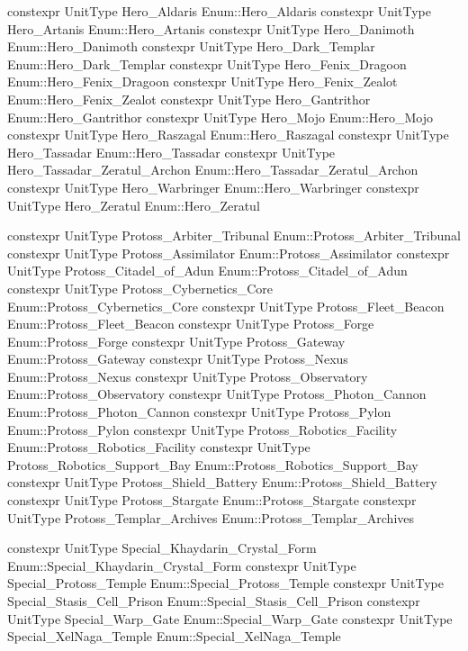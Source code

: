 \begin{codebox}[变量(神族英雄单位)]
constexpr UnitType Hero_Aldaris {Enum::Hero_Aldaris}
constexpr UnitType Hero_Artanis {Enum::Hero_Artanis}
constexpr UnitType Hero_Danimoth {Enum::Hero_Danimoth}
constexpr UnitType Hero_Dark_Templar {Enum::Hero_Dark_Templar}
constexpr UnitType Hero_Fenix_Dragoon {Enum::Hero_Fenix_Dragoon}
constexpr UnitType Hero_Fenix_Zealot {Enum::Hero_Fenix_Zealot}
constexpr UnitType Hero_Gantrithor {Enum::Hero_Gantrithor}
constexpr UnitType Hero_Mojo {Enum::Hero_Mojo}
constexpr UnitType Hero_Raszagal {Enum::Hero_Raszagal}
constexpr UnitType Hero_Tassadar {Enum::Hero_Tassadar}
constexpr UnitType Hero_Tassadar_Zeratul_Archon {Enum::Hero_Tassadar_Zeratul_Archon}
constexpr UnitType Hero_Warbringer {Enum::Hero_Warbringer}
constexpr UnitType Hero_Zeratul {Enum::Hero_Zeratul}
\end{codebox}
\begin{codebox}[变量(神族建筑)]
constexpr UnitType Protoss_Arbiter_Tribunal {Enum::Protoss_Arbiter_Tribunal}
constexpr UnitType Protoss_Assimilator {Enum::Protoss_Assimilator}
constexpr UnitType Protoss_Citadel_of_Adun {Enum::Protoss_Citadel_of_Adun}
constexpr UnitType Protoss_Cybernetics_Core {Enum::Protoss_Cybernetics_Core}
constexpr UnitType Protoss_Fleet_Beacon {Enum::Protoss_Fleet_Beacon}
constexpr UnitType Protoss_Forge {Enum::Protoss_Forge}
constexpr UnitType Protoss_Gateway {Enum::Protoss_Gateway}
constexpr UnitType Protoss_Nexus {Enum::Protoss_Nexus}
constexpr UnitType Protoss_Observatory {Enum::Protoss_Observatory}
constexpr UnitType Protoss_Photon_Cannon {Enum::Protoss_Photon_Cannon}
constexpr UnitType Protoss_Pylon {Enum::Protoss_Pylon}
constexpr UnitType Protoss_Robotics_Facility {Enum::Protoss_Robotics_Facility}
constexpr UnitType Protoss_Robotics_Support_Bay {Enum::Protoss_Robotics_Support_Bay}
constexpr UnitType Protoss_Shield_Battery {Enum::Protoss_Shield_Battery}
constexpr UnitType Protoss_Stargate {Enum::Protoss_Stargate}
constexpr UnitType Protoss_Templar_Archives {Enum::Protoss_Templar_Archives}
\end{codebox}
\begin{codebox}[变量(神族特殊建筑)]
constexpr UnitType Special_Khaydarin_Crystal_Form {Enum::Special_Khaydarin_Crystal_Form}
constexpr UnitType Special_Protoss_Temple {Enum::Special_Protoss_Temple}
constexpr UnitType Special_Stasis_Cell_Prison {Enum::Special_Stasis_Cell_Prison}
constexpr UnitType Special_Warp_Gate {Enum::Special_Warp_Gate}
constexpr UnitType Special_XelNaga_Temple {Enum::Special_XelNaga_Temple}
\end{codebox}
